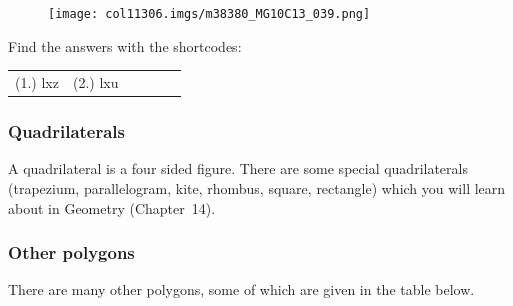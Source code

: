 \begin{table}[H]
\begin{enumerate}[noitemsep,
label=\textbf{\arabic*}. ]
\begin{figure}[H]
\begin{center}
\label{m38380*id318571!!!underscore!!!media}\label{
m38380*id318571!!!underscore!!!printimage}\texttt{[image: 
col11306.imgs/m38380\_MG10C13\_039.png]} %
        
    
    \end{center}

 \end{figure}   

    \addtocounter{footnote}{-0}
            \end{enumerate}
        
          

        
  
      
      \label{m38380*eip-75}
\par {} Find the
answers with the shortcodes:
 \par \begin{tabular}[h]{cccccc}
 (1.) lxz  &  (2.) lxu  & \end{tabular}



        \subsubsection{ Quadrilaterals}
        \nopagebreak
        \label{m38380*eip-366}
A quadrilateral is a four sided figure. There are some special quadrilaterals
(trapezium, parallelogram, kite, rhombus, square, rectangle) which you will
learn about in Geometry (Chapter~14). 
\par \label{m38380*uid91}
        \subsubsection{ Other polygons}
        \nopagebreak
        
        
        \label{m38380*id319439}There are many other polygons, some of which are
given in the table below.\par 
        
    
      

\end{table}
